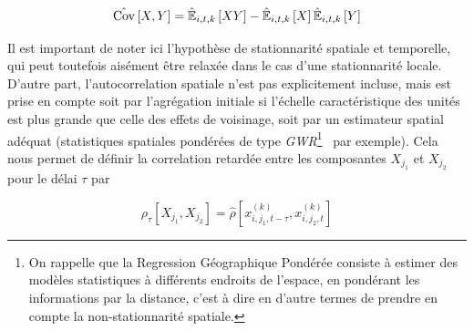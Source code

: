 {\[
\hat{\operatorname{Cov}}\left[X,Y\right] = \hat{\mathbb{E}}_{i,t,k}\left[XY\right] - \hat{\mathbb{E}}_{i,t,k}\left[X\right]\hat{\mathbb{E}}_{i,t,k}\left[Y\right]
\]

Il est important de noter ici l'hypothèse de stationnarité spatiale et temporelle, qui peut toutefois aisément être relaxée dans le cas d'une stationnarité locale. D'autre part, l'autocorrelation spatiale n'est pas explicitement incluse, mais est prise en compte soit par l'agrégation initiale si l'échelle caractéristique des unités est plus grande que celle des effets de voisinage, soit par un estimateur spatial adéquat (statistiques spatiales pondérées de type \emph{GWR}\footnote{On rappelle que la Regression Géographique Pondérée consiste à estimer des modèles statistiques à différents endroits de l'espace, en pondérant les informations par la distance, c'est à dire en d'autre termes de prendre en compte la non-stationnarité spatiale.}~\cite{brunsdon1998geographically} par exemple). Cela nous permet de définir la correlation retardée entre les composantes $X_{j_1}$ et $X_{j_2}$ pour le délai $\tau$ par
}


\begin{equation}
\rho_{\tau}\left[X_{j_1},X_{j_2}\right] = \hat{\rho}\left[x^{(k)}_{i,j_1,t - \tau},x^{(k)}_{i,j_2,t}\right]
\end{equation}




